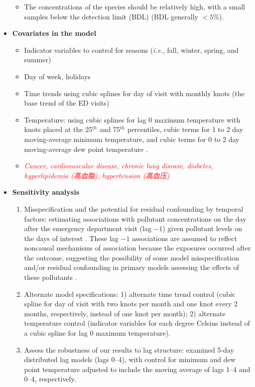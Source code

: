 \documentclass{article}
\begin{document}
\begin{itemize}
{\begin{itemize}
            \item The concentrations of the species should be relatively high, with a small samples below the detection limit (BDL) (BDL generally $<5\%$).
        \end{itemize}
    }
    \item \textbf{Covariates in the model} {
        \begin{itemize}
            \item Indicator variables to control for seasons (\textit{i.e.,} fall, winter, spring, and summer)
            \item Day of week, holidays
            \item Time trends using cubic splines for day of visit with monthly knots (the base trend of the ED visits)
            \item Temperature: using cubic splines for lag 0 maximum temperature with knots placed at the 25$^{th}$ and 75$^{th}$ percentiles, cubic terms for 1 to 2 day moving-average minimum temperature, and cubic terms for 0 to 2 day moving-average dew point temperature \citep{strickland2010short}.
            \item \textit{\textcolor{red}{Cancer, cardiovascular disease, chronic lung disease, diabetes, hyperlipidemia (高血脂), hypertension (高血压)}}
        \end{itemize}
    }
    \item \textbf{Sensitivity analysis} {
        \begin{enumerate}
            \item Misspecification and the potential for residual confounding by temporal factors: estimating associations with pollutant concentrations on the day after the emergency department visit (lag $-1$) given pollutant levels on the days of interest \citep{flanders2011method}. These lag $-1$ associations are assumed to reflect noncausal mechanisms of association because the exposures occurred after the outcome, suggesting the possibility of some model misspecification and/or residual confounding in primary models assessing the effects of these pollutants \citep{flanders2011method}.
            \item Alternate model specifications: 1) alternate time trend control (cubic spline for day of visit with two knots per month and one knot every 2 months, respectively, instead of one knot per month); 2) alternate temperature control (indicator variables for each degree Celsius instead of a cubic spline for lag 0 maximum temperature).
            \item Assess the robustness of our results to lag structure: examined 5-day distributed lag models (lags 0--4), with control for minimum and dew point temperature adjusted to include the moving average of lags 1--4 and 0--4, respectively.

\end{enumerate}}
\end{itemize}
\end{document}
